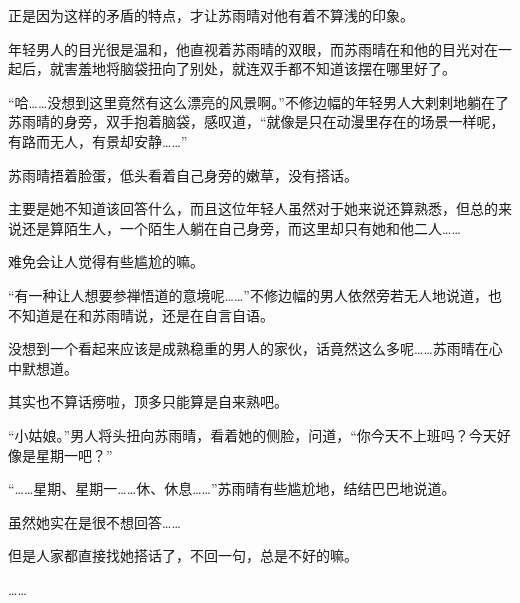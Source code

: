 正是因为这样的矛盾的特点，才让苏雨晴对他有着不算浅的印象。

年轻男人的目光很是温和，他直视着苏雨晴的双眼，而苏雨晴在和他的目光对在一起后，就害羞地将脑袋扭向了别处，就连双手都不知道该摆在哪里好了。

“哈……没想到这里竟然有这么漂亮的风景啊。”不修边幅的年轻男人大剌剌地躺在了苏雨晴的身旁，双手抱着脑袋，感叹道，“就像是只在动漫里存在的场景一样呢，有路而无人，有景却安静……”

苏雨晴捂着脸蛋，低头看着自己身旁的嫩草，没有搭话。

主要是她不知道该回答什么，而且这位年轻人虽然对于她来说还算熟悉，但总的来说还是算陌生人，一个陌生人躺在自己身旁，而这里却只有她和他二人……

难免会让人觉得有些尴尬的嘛。

“有一种让人想要参禅悟道的意境呢……”不修边幅的男人依然旁若无人地说道，也不知道是在和苏雨晴说，还是在自言自语。

没想到一个看起来应该是成熟稳重的男人的家伙，话竟然这么多呢……苏雨晴在心中默想道。

其实也不算话痨啦，顶多只能算是自来熟吧。

“小姑娘。”男人将头扭向苏雨晴，看着她的侧脸，问道，“你今天不上班吗？今天好像是星期一吧？”

“……星期、星期一……休、休息……”苏雨晴有些尴尬地，结结巴巴地说道。

虽然她实在是很不想回答……

但是人家都直接找她搭话了，不回一句，总是不好的嘛。

……
